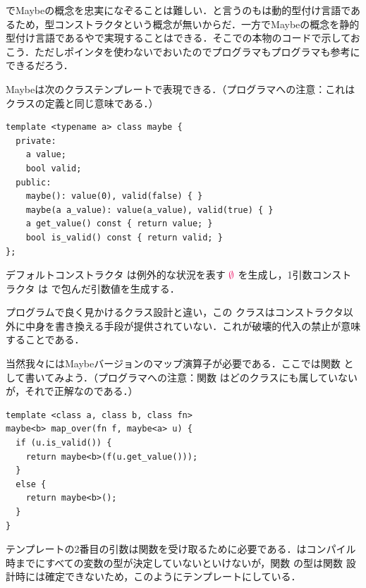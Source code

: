 \documentclass[a5paper,twoside,fleqn,draft]{jsbook}
\begin{document}
\python でMaybeの概念を忠実になぞることは難しい．と言うのも\python は動的型付け言語であるため，型コンストラクタという概念が無いからだ．一方でMaybeの概念を静的型付け言語である\cxx や\java で実現することはできる．そこで\cxx の本物のコードで示しておこう．ただしポインタを使わないでおいたので\cxx プログラマも\java プログラマも参考にできるだろう．

Maybeは次のクラステンプレートで表現できる．（\java プログラマへの注意：これはクラスの定義と同じ意味である．）
\begin{cxxcode}
\begin{verbatim}
template <typename a> class maybe {
  private:
    a value;
    bool valid;
  public:
    maybe(): value(0), valid(false) { }
    maybe(a a_value): value(a_value), valid(true) { }
    a get_value() const { return value; }
    bool is_valid() const { return valid; }
};
\end{verbatim}
\end{cxxcode}
デフォルトコンストラクタ  は例外的な状況を表す $\mNothing$ を生成し，1引数コンストラクタ  は  で包んだ引数値を生成する．

\cxx プログラムで良く見かけるクラス設計と違い，この  クラスはコンストラクタ以外に中身を書き換える手段が提供されていない．これが破壊的代入の禁止が意味することである．

当然我々にはMaybeバージョンのマップ演算子が必要である．ここでは関数  として書いてみよう．（\java プログラマへの注意：関数  はどのクラスにも属していないが，それで正解なのである．）
\begin{cxxcode}
\begin{verbatim}
template <class a, class b, class fn>
maybe<b> map_over(fn f, maybe<a> u) {
  if (u.is_valid()) {
    return maybe<b>(f(u.get_value()));
  }
  else {
    return maybe<b>();
  }
}
\end{verbatim}
\end{cxxcode}
テンプレートの2番目の引数は関数を受け取るために必要である．\cxx はコンパイル時までにすべての変数の型が決定していないといけないが，関数  の型は関数  設計時には確定できないため，このようにテンプレートにしている．
\end{document}
